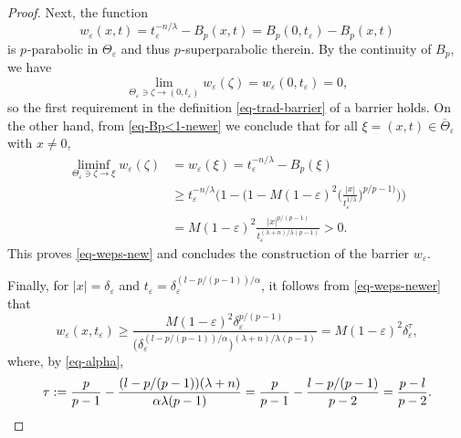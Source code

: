 \documentclass[10pt,a4paper]{amsart}
\newcommand{\al}{\alpha}
\newcommand{\de}{\delta}
\newcommand{\eps}{\varepsilon}
\newcommand{\la}{\lambda}
\newcommand{\p}{{$p\mspace{1mu}$}}
\begin{document}
\begin{proof}
Next,  the function
\[
 w_\eps(x,t) = t_\eps^{-n/\la} - B_p(x,t)=
B_p(0,t_\eps) - B_p(x,t)
\]
is \p-parabolic in $\Theta_\eps$
and thus \p-superparabolic therein.
By the continuity of $B_p$, we have
\begin{equation} \label{eq-wt_eps-lim-new}
\lim_{\Theta_\eps \ni \zeta \to (0,t_\eps)} w_\eps(\zeta) = w_\eps(0,t_\eps) = 0,
\end{equation}
so the first requirement in the definition \eqref{eq-trad-barrier} of 
a barrier holds.
On the other hand, from \eqref{eq-Bp<1-newer}
we conclude that 
for all $\xi =(x,t) \in \overline{\Theta}_\eps$ with  $x\ne0$,
\begin{align} %
\liminf_{\Theta_\eps \ni \zeta \to \xi} w_{\eps}(\zeta) 
&= w_{\eps}(\xi) 
= t_\eps^{-n/\la} - B_p(\xi) \nonumber\\
& \ge t_\eps^{-n/\la} \biggl( 1- \biggl(1- M(1-\eps)^2 
\biggl( \frac{|x|}{t_\eps^{1/\la}} \biggr)^{p/{p-1)}}
\biggr)
\biggr) \nonumber \\
&= M(1-\eps)^2\frac{|x|^{p/(p-1)}}{ t_\eps^{(\la+n)/\la(p-1)} } 
> 0.  \label{eq-weps-newer}
\end{align}
This proves \eqref{eq-weps-new} and
concludes the construction of the barrier $w_\eps$.

Finally, for $|x|=\de_\eps$ and $t_\eps= \de_\eps^{(l-p/(p-1))/\al}$,
it follows from 
\eqref{eq-weps-newer} that
\[
w_{\eps}(x,t_\eps) \ge
\frac{ M(1-\eps)^2 \de_\eps^{p/(p-1)}}{ \bigl(\de_\eps^{(l-p/(p-1))/\al} \bigr)^{(\la+n)/\la(p-1)} }   
= M(1-\eps)^2 \de_\eps^\tau,
\]
where, by \eqref{eq-alpha},
\begin{equation*}   %
\tau := \frac{p}{p-1} - \frac{(l-p/(p-1))(\la+n)}{\al \la (p-1)} 
= \frac{p}{p-1} - \frac{l-p/(p-1)}{p-2} 
= \frac{p-l}{p-2}.\qedhere
\end{equation*}
\end{proof}
\end{document}

